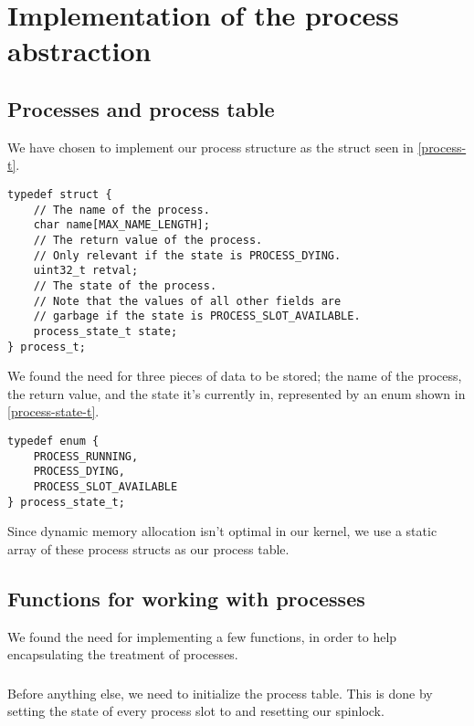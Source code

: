 \section{Implementation of the process abstraction}

\subsection{Processes and process table}

We have chosen to implement our process structure as the struct seen in
\autoref{process-t}.

\lstset{caption=The process structure.,label=process-t,float}
\begin{lstlisting}
typedef struct {
    // The name of the process.
    char name[MAX_NAME_LENGTH];
    // The return value of the process.
    // Only relevant if the state is PROCESS_DYING.
    uint32_t retval;
    // The state of the process.
    // Note that the values of all other fields are
    // garbage if the state is PROCESS_SLOT_AVAILABLE.
    process_state_t state;
} process_t;
\end{lstlisting}

We found the need for three pieces of data to be stored; the name of the
process, the return value, and the state it's currently in, represented
by an enum shown in \autoref{process-state-t}.

\lstset{caption=The process state enum.,label=process-state-t,float}
\begin{lstlisting}
typedef enum {
    PROCESS_RUNNING,
    PROCESS_DYING,
    PROCESS_SLOT_AVAILABLE
} process_state_t;
\end{lstlisting}

Since dynamic memory allocation isn't optimal in our kernel, we use a
static array of these process structs as our process table.

\subsection{Functions for working with processes}

We found the need for implementing a few functions, in order to help
encapsulating the treatment of processes.

\subsubsection{}
Before anything else, we need to initialize the process table. This is done by
setting the state of every process slot to  and
resetting our spinlock.


